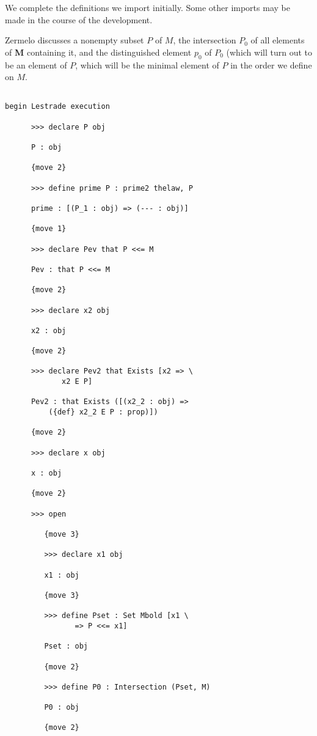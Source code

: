 \documentclass[12pt]{article}
\begin{document}
We complete the definitions we import initially.  Some other imports may be made in the course of the development.

Zermelo discusses a nonempty subset $P$ of $M$, the intersection $P_0$ of all elements of {\bf M} containing it, and the distinguished element $p_0$ of $P_0$ (which will turn out to be an element of $P$, which will be the minimal element of $P$ in the order we define on $M$.

\begin{verbatim}

begin Lestrade execution

      >>> declare P obj

      P : obj

      {move 2}

      >>> define prime P : prime2 thelaw, P

      prime : [(P_1 : obj) => (--- : obj)]

      {move 1}

      >>> declare Pev that P <<= M

      Pev : that P <<= M

      {move 2}

      >>> declare x2 obj

      x2 : obj

      {move 2}

      >>> declare Pev2 that Exists [x2 => \
             x2 E P]

      Pev2 : that Exists ([(x2_2 : obj) => 
          ({def} x2_2 E P : prop)])

      {move 2}

      >>> declare x obj

      x : obj

      {move 2}

      >>> open

         {move 3}

         >>> declare x1 obj

         x1 : obj

         {move 3}

         >>> define Pset : Set Mbold [x1 \
                => P <<= x1]

         Pset : obj

         {move 2}

         >>> define P0 : Intersection (Pset, M)

         P0 : obj

         {move 2}


\end{verbatim}
\end{document}
